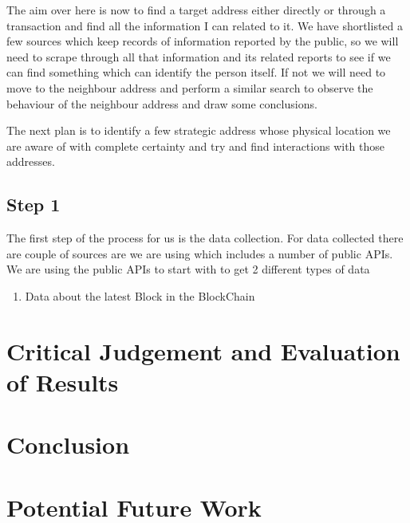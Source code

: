 \documentclass{article}
\begin{document}
    The aim over here is now to find a target address either directly or through a transaction and find all the information I can related to it. We have shortlisted a few sources which keep records of information reported by the public, so we will need to scrape through all that information and its related reports to see if we can find something which can identify the person itself. If not we will need to move to the neighbour address and perform a similar search to observe the behaviour of the neighbour address and draw some conclusions. 
    
    The next plan is to identify a few strategic address whose physical location we are aware of with complete certainty and try and find interactions with those addresses.
    
    \subsection{Step 1}
        The first step of the process for us is the data collection. For data collected there are couple of sources are we are using which includes a number of public APIs. We are using the public APIs to start with to get 2 different types of data
        \begin{enumerate}
            \item Data about the latest Block in the BlockChain
        \end{enumerate}
        
\pagebreak
\section{Critical Judgement and Evaluation of Results}
\pagebreak
\section{Conclusion}
\pagebreak
\section{Potential Future Work}
\pagebreak

 
\end{document}
